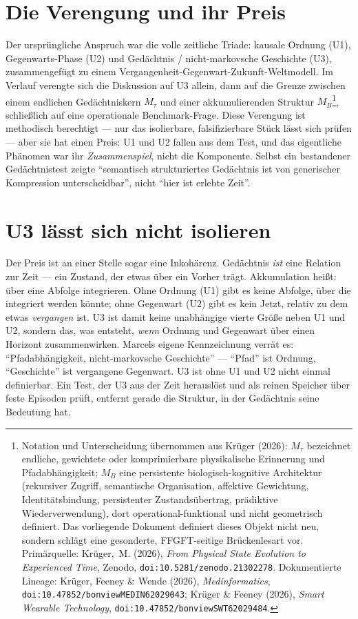 \section{Die Verengung und ihr Preis}

Der ursprüngliche Anspruch war die volle zeitliche Triade: kausale Ordnung (U1),
Gegenwarts-Phase (U2) und Gedächtnis / nicht-markovsche Geschichte (U3), zusammengefügt zu
einem Vergangenheit-Gegenwart-Zukunft-Weltmodell. Im Verlauf verengte sich die Diskussion
auf U3 allein, dann auf die Grenze zwischen einem endlichen Gedächtniskern $M_\tau$ und
einer akkumulierenden Struktur $M_B$\footnote{Notation und Unterscheidung übernommen aus
Krüger (2026): $M_\tau$ bezeichnet endliche, gewichtete oder komprimierbare physikalische
Erinnerung und Pfadabhängigkeit; $M_B$ eine persistente biologisch-kognitive Architektur
(rekursiver Zugriff, semantische Organisation, affektive Gewichtung, Identitätsbindung,
persistenter Zustandsübertrag, prädiktive Wiederverwendung), dort operational-funktional und
nicht geometrisch definiert. Das vorliegende Dokument definiert dieses Objekt nicht neu,
sondern schlägt eine gesonderte, FFGFT-seitige Brückenlesart vor. Primärquelle: Krüger,~M.
(2026), \emph{From Physical State Evolution to Experienced Time}, Zenodo,
\texttt{doi:10.5281/zenodo.21302278}. Dokumentierte Lineage: Krüger, Feeney \& Wende (2026),
\emph{Medinformatics}, \texttt{doi:10.47852/bonviewMEDIN62029043}; Krüger \& Feeney (2026),
\emph{Smart Wearable Technology}, \texttt{doi:10.47852/bonviewSWT62029484}.}, schließlich auf
eine operationale Benchmark-Frage.
Diese Verengung ist methodisch berechtigt --- nur das isolierbare, falsifizierbare Stück
lässt sich prüfen --- aber sie hat einen Preis: U1 und U2 fallen aus dem Test, und das
eigentliche Phänomen war ihr \emph{Zusammenspiel}, nicht die Komponente. Selbst ein
bestandener Gedächtnistest zeigte \enquote{semantisch strukturiertes Gedächtnis ist von
generischer Kompression unterscheidbar}, nicht \enquote{hier ist erlebte Zeit}.

\section{U3 lässt sich nicht isolieren}

Der Preis ist an einer Stelle sogar eine Inkohärenz. Gedächtnis \emph{ist} eine Relation
zur Zeit --- ein Zustand, der etwas über ein Vorher trägt. Akkumulation heißt: über eine
Abfolge integrieren. Ohne Ordnung (U1) gibt es keine Abfolge, über die integriert werden
könnte; ohne Gegenwart (U2) gibt es kein Jetzt, relativ zu dem etwas \emph{vergangen} ist.
U3 ist damit keine unabhängige vierte Größe neben U1 und U2, sondern das, was entsteht,
\emph{wenn} Ordnung und Gegenwart über einen Horizont zusammenwirken. Marcels eigene
Kennzeichnung verrät es: \enquote{Pfadabhängigkeit, nicht-markovsche Geschichte}
--- \enquote{Pfad} ist Ordnung, \enquote{Geschichte} ist vergangene Gegenwart. U3 ist ohne
U1 und U2 nicht einmal definierbar. Ein Test, der U3 aus der Zeit herauslöst und als reinen
Speicher über feste Episoden prüft, entfernt gerade die Struktur, in der Gedächtnis seine
Bedeutung hat.

